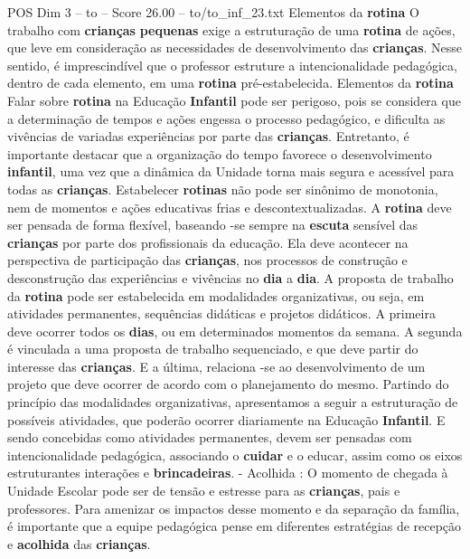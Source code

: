 \begin{textsample}{POS Dim 3 – to – Score 26.00 – to/to\_inf\_23.txt}  \label{ex:f3_pos_103}
Elementos da \textbf{rotina} O trabalho com \textbf{crianças} \textbf{pequenas} exige a estruturação de uma \textbf{rotina} de ações, que leve em consideração as necessidades de desenvolvimento das \textbf{crianças}.
Nesse sentido, é imprescindível que o professor estruture a intencionalidade pedagógica, dentro de cada elemento, em uma \textbf{rotina} pré-estabelecida.
Elementos da \textbf{rotina} Falar sobre \textbf{rotina} na Educação \textbf{Infantil} pode ser perigoso, pois se considera que a determinação de tempos e ações engessa o processo pedagógico, e dificulta as vivências de variadas experiências por parte das \textbf{crianças}.
Entretanto, é importante destacar que a organização do tempo favorece o desenvolvimento \textbf{infantil}, uma vez que a dinâmica da Unidade torna mais segura e acessível para todas as \textbf{crianças}.
Estabelecer \textbf{rotinas} não pode ser sinônimo de monotonia, nem de momentos e ações educativas frias e descontextualizadas.
A \textbf{rotina} deve ser pensada de forma flexível, baseando -se sempre na \textbf{escuta} sensível das \textbf{crianças} por parte dos profissionais da educação.
Ela deve acontecer na perspectiva de participação das \textbf{crianças}, nos processos de construção e desconstrução das experiências e vivências no \textbf{dia} a \textbf{dia}.
A proposta de trabalho da \textbf{rotina} pode ser estabelecida em modalidades organizativas, ou seja, em atividades permanentes, sequências didáticas e projetos didáticos.
A primeira deve ocorrer todos os \textbf{dias}, ou em determinados momentos da semana.
A segunda é vinculada a uma proposta de trabalho sequenciado, e que deve partir do interesse das \textbf{crianças}.
E a última, relaciona -se ao desenvolvimento de um projeto que deve ocorrer de acordo com o planejamento do mesmo.
Partindo do princípio das modalidades organizativas, apresentamos a seguir a estruturação de possíveis atividades, que poderão ocorrer diariamente na Educação \textbf{Infantil}.
E sendo concebidas como atividades permanentes, devem ser pensadas com intencionalidade pedagógica, associando o \textbf{cuidar} e o educar, assim como os eixos estruturantes interações e \textbf{brincadeiras}. - Acolhida : O momento de chegada à Unidade Escolar pode ser de tensão e estresse para as \textbf{crianças}, pais e professores.
Para amenizar os impactos desse momento e da separação da família, é importante que a equipe pedagógica pense em diferentes estratégias de recepção e \textbf{acolhida} das \textbf{crianças}.

\end{textsample}
